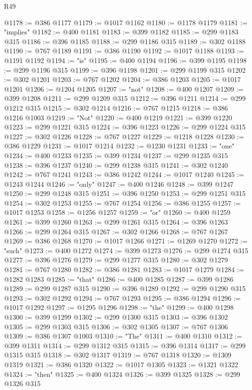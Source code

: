 \begin{lexlean}{R49}
\begin{coremodule}
@1178 := @386 @1177
@1179 := @1017 @1162
@1180 := @1178 @1179
@1181 := "implies"
@1182 := @400 @1181
@1183 := @399 @1182
@1185 := @299 @1183 @315
@1186 := @396 @1185
@1188 := @299 @1186 @315
@1189 := @302 @1188
@1190 := @767 @1189
@1191 := @386 @1190
@1192 := @1017 @1188
@1193 := @1191 @1192
@1194 := "is"
@1195 := @400 @1194
@1196 := @399 @1195
@1198 := @299 @1196 @315
@1199 := @396 @1198
@1201 := @299 @1199 @315
@1202 := @302 @1201
@1203 := @767 @1202
@1204 := @386 @1203
@1205 := @1017 @1201
@1206 := @1204 @1205
@1207 := "not"
@1208 := @400 @1207
@1209 := @399 @1208
@1211 := @299 @1209 @315
@1212 := @396 @1211
@1214 := @299 @1212 @315
@1215 := @302 @1214
@1216 := @767 @1215
@1218 := @386 @1216 @1003
@1219 := "Not"
@1220 := @400 @1219
@1221 := @399 @1220
@1223 := @299 @1221 @315
@1224 := @396 @1223
@1226 := @299 @1224 @315
@1227 := @302 @1226
@1228 := @767 @1227
@1229 := @1218 @1228
@1230 := @386 @1229
@1231 := @1017 @1214
@1232 := @1230 @1231
@1233 := "one"
@1234 := @400 @1233
@1235 := @399 @1234
@1237 := @299 @1235 @315
@1238 := @396 @1237
@1240 := @299 @1238 @315
@1241 := @302 @1240
@1242 := @767 @1241
@1243 := @386 @1242
@1244 := @1017 @1240
@1245 := @1243 @1244
@1246 := "only"
@1247 := @400 @1246
@1248 := @399 @1247
@1250 := @299 @1248 @315
@1251 := @396 @1250
@1253 := @299 @1251 @315
@1254 := @302 @1253
@1255 := @767 @1254
@1256 := @386 @1255
@1257 := @1017 @1253
@1258 := @1256 @1257
@1259 := "or"
@1260 := @400 @1259
@1261 := @399 @1260
@1263 := @299 @1261 @315
@1264 := @396 @1263
@1266 := @299 @1264 @315
@1267 := @302 @1266
@1268 := @767 @1267
@1269 := @386 @1268
@1270 := @1017 @1266
@1271 := @1269 @1270
@1272 := "such"
@1273 := @400 @1272
@1274 := @399 @1273
@1276 := @299 @1274 @315
@1277 := @396 @1276
@1279 := @299 @1277 @315
@1280 := @302 @1279
@1281 := @767 @1280
@1282 := @386 @1281
@1283 := @1017 @1279
@1284 := @1282 @1283
@1285 := "that"
@1286 := @400 @1285
@1287 := @399 @1286
@1289 := @299 @1287 @315
@1290 := @396 @1289
@1292 := @299 @1290 @315
@1293 := @302 @1292
@1294 := @767 @1293
@1295 := @386 @1294
@1296 := @1017 @1292
@1297 := @1295 @1296
@1298 := "the"
@1299 := @400 @1298
@1300 := @399 @1299
@1302 := @299 @1300 @315
@1303 := @396 @1302
@1305 := @299 @1303 @315
@1306 := @302 @1305
@1307 := @767 @1306
@1309 := @386 @1307 @1003
@1310 := "The"
@1311 := @400 @1310
@1312 := @399 @1311
@1314 := @299 @1312 @315
@1315 := @396 @1314
@1317 := @299 @1315 @315
@1318 := @302 @1317
@1319 := @767 @1318
@1320 := @1309 @1319
@1321 := @386 @1320
@1322 := @1017 @1305
@1323 := @1321 @1322
@1324 := "then"
@1325 := @400 @1324
@1326 := @399 @1325
@1328 := @299 @1326 @315

\end{coremodule}
\end{lexlean}
